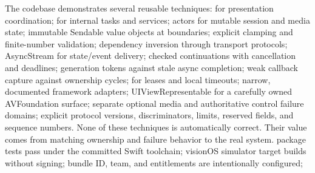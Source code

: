 {}The codebase demonstrates several reusable techniques:\markdownRendererInterblockSeparator
{}\markdownRendererUlBegin
\markdownRendererUlItem {} for presentation coordination;\markdownRendererUlItemEnd 
\markdownRendererUlItem {} for internal tasks and services;\markdownRendererUlItemEnd 
\markdownRendererUlItem actors for mutable session and media state;\markdownRendererUlItemEnd 
\markdownRendererUlItem immutable Sendable value objects at boundaries;\markdownRendererUlItemEnd 
\markdownRendererUlItem explicit clamping and finite-number validation;\markdownRendererUlItemEnd 
\markdownRendererUlItem dependency inversion through transport protocols;\markdownRendererUlItemEnd 
\markdownRendererUlItem AsyncStream for state/event delivery;\markdownRendererUlItemEnd 
\markdownRendererUlItem checked continuations with cancellation and deadlines;\markdownRendererUlItemEnd 
\markdownRendererUlItem generation tokens against stale async completion;\markdownRendererUlItemEnd 
\markdownRendererUlItem weak callback capture against ownership cycles;\markdownRendererUlItemEnd 
\markdownRendererUlItem {} for leases and local timeouts;\markdownRendererUlItemEnd 
\markdownRendererUlItem narrow, documented  framework adapters;\markdownRendererUlItemEnd 
\markdownRendererUlItem UIViewRepresentable for a carefully owned AVFoundation surface;\markdownRendererUlItemEnd 
\markdownRendererUlItem separate optional media and authoritative control failure domains;\markdownRendererUlItemEnd 
\markdownRendererUlItem explicit protocol versions, discriminators, limits, reserved fields, and sequence numbers.\markdownRendererUlItemEnd 
\markdownRendererUlEnd \markdownRendererInterblockSeparator
{}None of these techniques is automatically correct. Their value comes from matching ownership and failure behavior to the real system.\markdownRendererInterblockSeparator
{}
\markdownRendererSectionEnd \markdownRendererSectionBegin
{}\markdownRendererInterblockSeparator
{}\markdownRendererUlBegin
\markdownRendererUlItem \markdownRendererUntickedBox{} package tests pass under the committed Swift toolchain;\markdownRendererUlItemEnd 
\markdownRendererUlItem \markdownRendererUntickedBox{} visionOS simulator target builds without signing;\markdownRendererUlItemEnd 
\markdownRendererUlItem \markdownRendererUntickedBox{} bundle ID, team, and entitlements are intentionally configured;\markdownRendererUlItemEnd 
